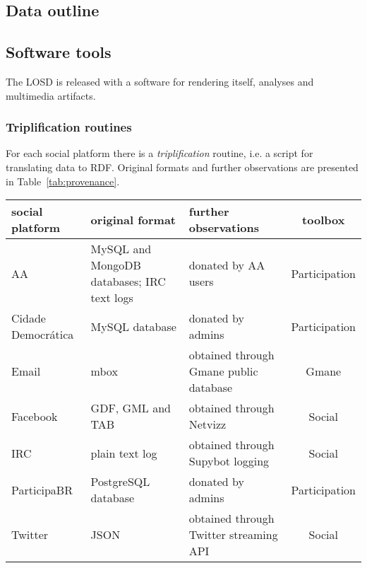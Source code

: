 \documentclass[review]{elsarticle}
\begin{document}
\subsection{Data outline}





\subsection{Software tools}
The LOSD is released with a software for rendering itself, analyses and
multimedia artifacts.
\subsubsection{Triplification routines}
For each social platform there is a \emph{triplification} routine,
i.e. a script for translating data to RDF.
Original formats and further observations are presented in
Table~\ref{tab:provenance}.
\begin{table*}[h!]\scriptsize
\begin{center}
\caption{Social platforms, original formats and further observations for
the LOSD dataset.}\label{tab:provenance}
\begin{tabular}{| l || p{3cm} | p{3cm} | c |}\hline
    \textbf{social platform} & \textbf{original format} & \textbf{further observations} & \textbf{toolbox} \\\hline\hline
    AA & MySQL and MongoDB databases; IRC text logs & donated by AA users & Participation \\\hline
    Cidade Democrática & MySQL database & donated by admins & Participation \\\hline
    Email & mbox & obtained through Gmane public database & Gmane \\\hline
    Facebook & GDF, GML and TAB & obtained through Netvizz~\cite{netvizz} & Social \\\hline
    IRC & plain text log & obtained through Supybot logging & Social \\\hline
    ParticipaBR & PostgreSQL database & donated by admins & Participation \\\hline
    Twitter & JSON & obtained through Twitter streaming API & Social \\\hline
\end{tabular}\end{center}
\end{table*}                    
\end{document}
